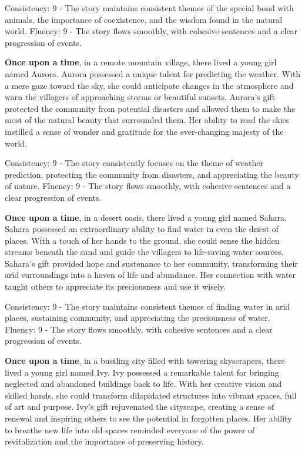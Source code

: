 \documentclass{article}
\begin{document}
Consistency: 9 - The story maintains consistent themes of the special bond with animals, the importance of coexistence, and the wisdom found in the natural world.
Fluency: 9 - The story flows smoothly, with cohesive sentences and a clear progression of events.

\textbf{Once upon a time}, in a remote mountain village, there lived a young girl named Aurora. Aurora possessed a unique talent for predicting the weather. With a mere gaze toward the sky, she could anticipate changes in the atmosphere and warn the villagers of approaching storms or beautiful sunsets. Aurora's gift protected the community from potential disasters and allowed them to make the most of the natural beauty that surrounded them. Her ability to read the skies instilled a sense of wonder and gratitude for the ever-changing majesty of the world.

Consistency: 9 - The story consistently focuses on the theme of weather prediction, protecting the community from disasters, and appreciating the beauty of nature.
Fluency: 9 - The story flows smoothly, with cohesive sentences and a clear progression of events.

\textbf{Once upon a time}, in a desert oasis, there lived a young girl named Sahara. Sahara possessed an extraordinary ability to find water in even the driest of places. With a touch of her hands to the ground, she could sense the hidden streams beneath the sand and guide the villagers to life-saving water sources. Sahara's gift provided hope and sustenance to her community, transforming their arid surroundings into a haven of life and abundance. Her connection with water taught others to appreciate its preciousness and use it wisely.

Consistency: 9 - The story maintains consistent themes of finding water in arid places, sustaining community, and appreciating the preciousness of water.
Fluency: 9 - The story flows smoothly, with cohesive sentences and a clear progression of events.

\textbf{Once upon a time}, in a bustling city filled with towering skyscrapers, there lived a young girl named Ivy. Ivy possessed a remarkable talent for bringing neglected and abandoned buildings back to life. With her creative vision and skilled hands, she could transform dilapidated structures into vibrant spaces, full of art and purpose. Ivy's gift rejuvenated the cityscape, creating a sense of renewal and inspiring others to see the potential in forgotten places. Her ability to breathe new life into old spaces reminded everyone of the power of revitalization and the importance of preserving history.
\end{document}
